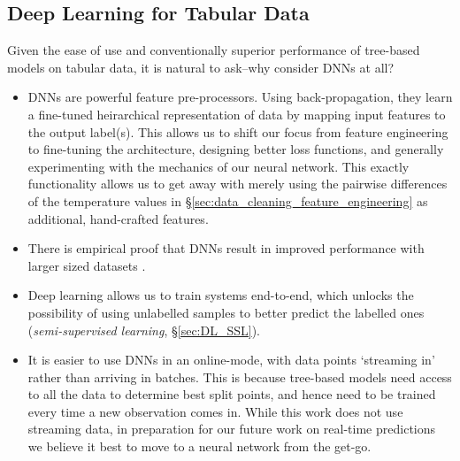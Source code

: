 \subsection{Deep Learning for Tabular Data}\label{sec:DL_tabnet}
Given the ease of use and conventionally superior performance of tree-based models on tabular data, it is natural to ask--why consider DNNs at all?
\begin{itemize}
    \item DNNs are powerful feature pre-processors. Using back-propagation, they learn a fine-tuned heirarchical representation of data by mapping input features to the output label(s). This allows us to shift our focus from feature engineering to fine-tuning the architecture, designing better loss functions, and generally experimenting with the mechanics of our neural network. This exactly functionality allows us to get away with merely using the pairwise differences of the temperature values in \S\ref{sec:data_cleaning_feature_engineering} as additional, hand-crafted features.
    \item There is empirical proof that DNNs result in improved performance with larger sized datasets \citep{airbnb}.
    \item Deep learning allows us to train systems end-to-end, which unlocks the possibility of using unlabelled samples to better predict the labelled ones (\emph{semi-supervised learning}, \S\ref{sec:DL_SSL}).
    \item It is easier to use DNNs in an online-mode, with data points `streaming in' rather than arriving in batches. This is because tree-based models need access to all the data to determine best split points, and hence need to be trained every time a new observation comes in. While this work does not use streaming data, in preparation for our future work on real-time predictions we believe it best to move to a neural network from the get-go.
\end{itemize}